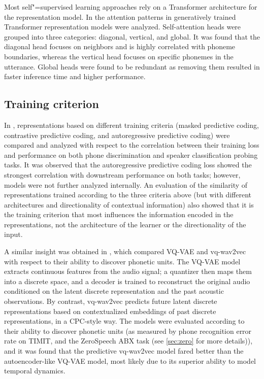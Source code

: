 Most self"=supervised learning approaches rely on a Transformer architecture for
the representation model. In \parencite{yang_understanding_2020} the attention patterns in
generatively trained Transformer representation models were analyzed.
Self-attention heads were grouped into three categories: diagonal, vertical,
and global. It was found that the diagonal head focuses on neighbors and is
highly correlated with phoneme boundaries, whereas the vertical head focuses on
specific phonemes in the utterance. Global heads were found to be redundant as
removing them resulted in faster inference time and higher performance.

\subsection{Training criterion}
In \parencite{chung_similarity_2021}, representations based on different training criteria
(masked predictive coding, contrastive predictive coding, and autoregressive
predictive coding) were compared  and analyzed with respect to the correlation
between their training loss and performance on both phone discrimination and
speaker classification probing tasks. It was observed that the autoregressive
predictive coding loss showed the strongest correlation with downstream
performance on both tasks; however, models were not further analyzed
internally. An evaluation of the similarity of representations trained
according to the three criteria above (but with different architectures and
directionality of contextual information) also showed that it is the training
criterion that most influences the information encoded in the representations,
not the architecture of the learner or the directionality of the input. 

A similar insight was obtained in \parencite{zhou_comparison_2020}, which compared VQ-VAE and
vq-wav2vec with respect to their ability to discover phonetic units.
The VQ-VAE model extracts continuous features from the audio signal; a
quantizer then  maps them into a discrete space, and a decoder is trained to
reconstruct the original audio conditioned on the latent discrete
representation and the past acoustic observations. By contrast, vq-wav2vec
predicts future latent discrete representations based on contextualized
embeddings of past discrete representations, in a CPC-style way. The models
were evaluated according to their ability to discover phonetic units (as
measured by phone recognition error rate on TIMIT, and the ZeroSpeech ABX task
(see \cref{sec:zero} for more details)), and it was found that the predictive vq-wav2vec
model fared better than the autoencoder-like VQ-VAE model, most likely due to
its superior ability to model temporal dynamics.

